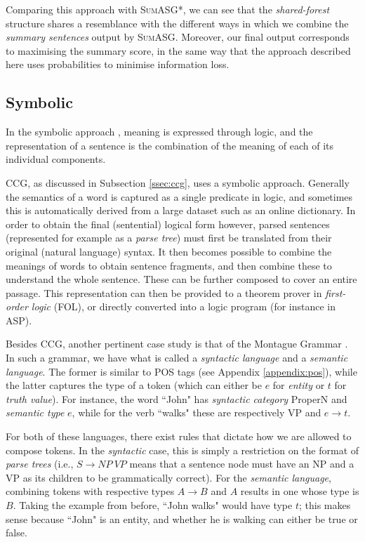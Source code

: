 Comparing this approach with \textsc{SumASG*}, we can see that the \textit{shared-forest} structure shares a resemblance with the different ways in which we combine the \textit{summary sentences} output by \textsc{SumASG}. Moreover, our final output corresponds to maximising the summary score, in the same way that the approach described here uses probabilities to minimise information loss.

\subsection{Symbolic}

In the symbolic approach \cite{clark_combining_nodate}, meaning is expressed through logic, and the representation of a sentence is the combination of the meaning of each of its individual components.

\mbox{}

CCG, as discussed in Subsection \ref{ssec:ccg}, uses a symbolic approach. Generally the semantics of a word is captured as a single predicate in logic, and sometimes this is automatically derived from a large dataset such as an online dictionary. In order to obtain the final (sentential) logical form however, parsed sentences (represented for example as a \textit{parse tree}) must first be translated from their original (natural language) syntax. It then becomes possible to combine the meanings of words to obtain sentence fragments, and then combine these to understand the whole sentence. These can be further composed to cover an entire passage. This representation can then be provided to a theorem prover in \textit{first-order logic} (FOL), or directly converted into a logic program (for instance in ASP).

\mbox{}

Besides CCG, another pertinent case study is that of the Montague Grammar \cite{partee_lecture_nodate}. In such a grammar, we have what is called a \textit{syntactic language} and a \textit{semantic language}. The former is similar to POS tags (see Appendix \ref{appendix:pos}), while the latter captures the type of a token (which can either be $e$ for \textit{entity} or $t$ for \textit{truth value}). For instance, the word ``John" has \textit{syntactic category} ProperN and \textit{semantic type} $e$, while for the verb ``walks" these are respectively VP and $e \to t$.

For both of these languages, there exist rules that dictate how we are allowed to compose tokens. In the \textit{syntactic} case, this is simply a restriction on the format of \textit{parse trees} (i.e., $S \to NP\ VP$ means that a sentence node must have an NP and a VP as its children to be grammatically correct). For the \textit{semantic language}, combining tokens with respective types $A \to B$ and $A$ results in one whose type is $B$. Taking the example from before, ``John walks" would have type $t$; this makes sense because ``John" is an entity, and whether he is walking can either be true or false.

